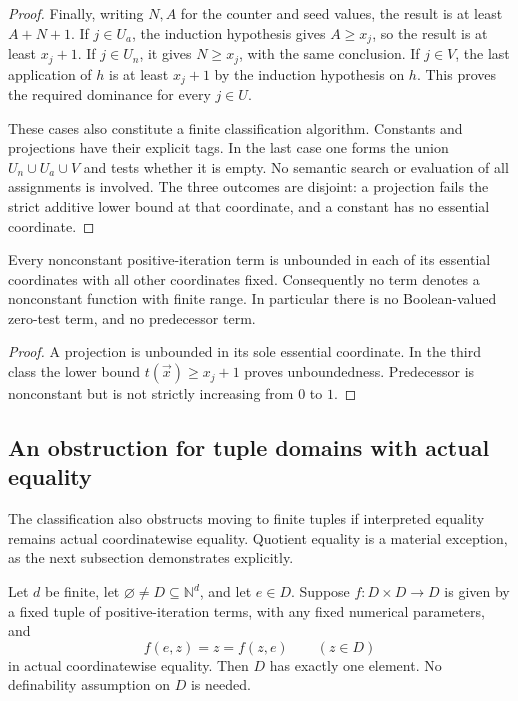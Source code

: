 \begin{proof}
Finally, writing $N,A$ for the counter and seed values, the result is at
least $A+N+1$. If $j\in U_a$, the induction hypothesis gives
$A\geq x_j$, so the result is at least $x_j+1$. If $j\in U_n$, it
gives $N\geq x_j$, with the same conclusion. If $j\in V$, the last
application of $h$ is at least $x_j+1$ by the induction hypothesis on
$h$. This proves the required dominance for every $j\in U$.

These cases also constitute a finite classification algorithm. Constants
and projections have their explicit tags. In the last case one forms
the union $U_n\cup U_a\cup V$ and tests whether it is empty. No
semantic search or evaluation of all assignments is involved.
The three outcomes are disjoint: a projection fails the strict additive
lower bound at that coordinate, and a constant has no essential
coordinate.
\end{proof}

\begin{corollary}
Every nonconstant positive-iteration term is unbounded in each of its
essential coordinates with all other coordinates fixed. Consequently no
term denotes a nonconstant function with finite range. In particular
there is no Boolean-valued zero-test term, and no predecessor term.
\end{corollary}

\begin{proof}
A projection is unbounded in its sole essential coordinate. In the third
class the lower bound $t(\vec x)\geq x_j+1$ proves unboundedness.
Predecessor is nonconstant but is not strictly increasing from $0$ to $1$.
\end{proof}

\subsection{An obstruction for tuple domains with actual equality}

The classification also obstructs moving to finite tuples if interpreted
equality remains actual coordinatewise equality. Quotient equality is a
material exception, as the next subsection demonstrates explicitly.

\begin{theorem}
\label{thm:positive-actual-unit}
Let $d$ be finite, let $\varnothing\ne D\subseteq\mathbb N^d$, and let
$e\in D$. Suppose $f:D\times D\to D$ is given by a fixed tuple of
positive-iteration terms, with any fixed numerical parameters, and
\[
                         f(e,z)=z=f(z,e)\qquad(z\in D)
\]
in actual coordinatewise equality. Then $D$ has exactly one element.
No definability assumption on $D$ is needed.
\end{theorem}

